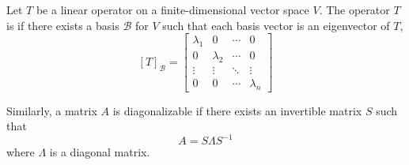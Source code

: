 \begin{definition}
Let $T$ be a linear operator on a finite-dimensional vector space $V$.
The operator $T$ is  if there exists a basis $\mathcal{B}$ for $V$ such that each basis vector is an eigenvector of $T$,
\begin{equation*}
\left[ T \right]_{\mathcal{B}}
= \left[ \begin{array}{cccc}
\lambda_1 & 0 & \cdots & 0 \\
0 & \lambda_2 & \cdots & 0 \\
\vdots & \vdots & \ddots & \vdots \\
0 & 0 & \cdots & \lambda_n
\end{array} \right]
\end{equation*}
\end{definition}

Similarly, a matrix $A$ is diagonalizable if there exists an invertible matrix $S$ such that
\begin{equation*}
A = S \Lambda S^{-1}
\end{equation*}
where $\Lambda$ is a diagonal matrix.

